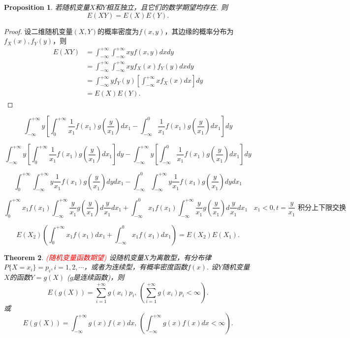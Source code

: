 \documentclass{article}
\newtheorem{theorem}{Theorem}[section]
\newtheorem{proposition}[theorem]{Proposition}
\newcommand{\redt}[1]{\textcolor{red}{#1}}
\begin{document}
\begin{proposition}\label{expectation: independent}
\rm 若随机变量$X$和$Y$相互独立，且它们的数学期望均存在. 则
$$
E(XY)=E(X)E(Y).
$$
\end{proposition}

\begin{proof}
\rm 设二维随机变量$(X,Y)$的概率密度为$f(x,y)$，其边缘的概率分布为$f_X(x),f_Y(y)$，则
$$
\begin{array}{ll}
E(XY) &= \int_{-\infty}^{+\infty}\int_{-\infty}^{+\infty} xyf(x,y)dxdy \\
&= \int_{-\infty}^{+\infty}\int_{-\infty}^{+\infty} xyf_X(x)f_Y(y)dxdy \\
&= \int_{-\infty}^{+\infty}yf_Y(y)\left[\int_{-\infty}^{+\infty}xf_X(x)dx\right]dy\\
&=E(X)E(Y).
\end{array}
$$
\end{proof}


$$
\int_{-\infty}^{+\infty}y \left[\int_0^{+\infty} \frac{1}{x_1}f(x_1)g(\frac{y}{x_1})dx_1 - \int_{-\infty}^0 \frac{1}{x_1}f(x_1)g(\frac{y}{x_1})dx_1 \right]dy
$$

$$
\int_{-\infty}^{+\infty}y \left[\int_0^{+\infty} \frac{1}{x_1}f(x_1)g(\frac{y}{x_1})dx_1\right]dy - \int_{-\infty}^{+\infty}y\left[\int_{-\infty}^0 \frac{1}{x_1}f(x_1)g(\frac{y}{x_1})dx_1 \right]dy
$$

$$
\int_0^{+\infty}\int_{-\infty}^{+\infty} y\frac{1}{x_1}f(x_1)g(\frac{y}{x_1})dydx_1 - \int_{-\infty}^0\int_{-\infty}^{+\infty} y\frac{1}{x_1}f(x_1)g(\frac{y}{x_1})dydx_1
$$

$$
\int_0^{+\infty}x_1f(x_1)\int_{-\infty}^{+\infty}\frac{y}{x_1}g(\frac{y}{x_1})d\frac{y}{x_1}dx_1 + \int_{-\infty}^0x_1f(x_1)\int_{-\infty}^{+\infty} \frac{y}{x_1}g(\frac{y}{x_1})d\frac{y}{x_1}dx_1 ~~~~ \text{$x_1 < 0, t=\frac{y}{x_1}$ 积分上下限交换}
$$

$$
E(X_2)\left(\int_0^{+\infty}x_1f(x_1)dx_1 +\int_{-\infty}^0x_1f(x_1)dx_1\right) = E(X_2)E(X_1).
$$


\begin{theorem}
\rm \redt{(随机变量函数期望)} 设随机变量$X$为离散型，有分布律$P\{X=x_i\}=p_i,i=1,2,\cdots$，或者为连续型，有概率密度函数$f(x)$. 设$Y$随机变量$X$的函数$Y=g(X)$ ($g$是连续函数)，则
$$
E(g(X))=\sum\limits_{i=1}^{+\infty}g(x_i)p_i,\,\left(\sum\limits_{i=1}^{+\infty}g(x_i)p_i < \infty \right) .
$$
或
$$
E(g(X)) = \int_{-\infty}^{+\infty}g(x)f(x)dx,\, \left(\int_{-\infty}^{+\infty}g(x)f(x)dx < \infty\right).
$$
\end{theorem}
\end{document}
